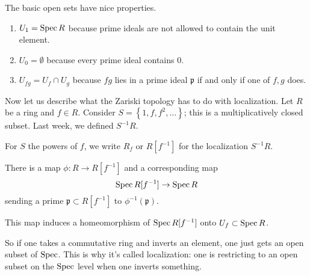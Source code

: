 The basic open sets have nice properties.
\begin{enumerate}
\item $U_1 = \operatorname{Spec} R$ because prime ideals are not allowed to
contain the
unit element. 
\item $U_0 = \emptyset$ because every prime ideal contains $0$.
\item $U_{fg} = U_f \cap U_g$ because $fg$ lies in a prime ideal
$\mathfrak{p}$ if and only if one of $f,g$ does.
\end{enumerate}

Now let us describe what the Zariski topology has to do with
localization.
Let $R$ be a ring and $f \in R$. Consider $S = \left\{1, f, f^2,
\dots
\right\}$; this is a multiplicatively closed subset. Last week,
we defined
$S^{-1}R$.

\begin{definition} 
For $S$ the powers of $f$, we write $R_f$ or  $R[f^{-1}]$ for the
localization $S^{-1}R$. 
\end{definition} 

There is  a map $\phi: R \to R[f^{-1}]$ and a corresponding map
\[ \operatorname{Spec} R[f^{-1}] \to \operatorname{Spec} R  \]
sending a prime $\mathfrak{p} \subset R[f^{-1}]$ to
$\phi^{-1}(\mathfrak{p})$.

\begin{proposition} 
This map induces a homeomorphism of $\operatorname{Spec} R[f^{-1}]$ onto $U_f
\subset \operatorname{Spec}
R$. 
\end{proposition} 
So if one takes a commutative ring and inverts an element, one
just gets an open
subset of $\operatorname{Spec}$. This is why it's called localization: one is
restricting to
an open subset on the $\operatorname{Spec} $ level when one inverts something.

